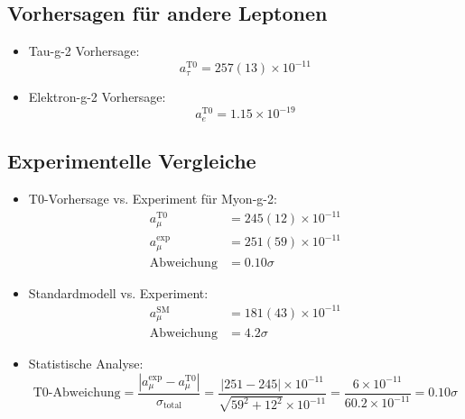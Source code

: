 \documentclass[12pt,a4paper]{article}
\begin{document}
	\subsection{Vorhersagen für andere Leptonen}
\begin{itemize}
	\item Tau-g-2 Vorhersage:
	\begin{equation}
		a_\tau^{\text{T0}} = 257(13) \times 10^{-11}
	\end{equation}
	
	\item Elektron-g-2 Vorhersage:
	\begin{equation}
		a_e^{\text{T0}} = 1.15 \times 10^{-19}
	\end{equation}
\end{itemize}

	\subsection{Experimentelle Vergleiche}
\begin{itemize}
	\item T0-Vorhersage vs. Experiment für Myon-g-2:
	\begin{align}
		a_\mu^{\text{T0}} &= 245(12) \times 10^{-11} \\
		a_\mu^{\text{exp}} &= 251(59) \times 10^{-11} \\
		\text{Abweichung} &= 0.10\sigma
	\end{align}
	
	\item Standardmodell vs. Experiment:
	\begin{align}
		a_\mu^{\text{SM}} &= 181(43) \times 10^{-11} \\
		\text{Abweichung} &= 4.2\sigma
	\end{align}
	
	\item Statistische Analyse:
	\begin{equation}
		\text{T0-Abweichung} = \frac{|a_\mu^{\text{exp}} - a_\mu^{\text{T0}}|}{\sigma_{\text{total}}} = \frac{|251 - 245| \times 10^{-11}}{\sqrt{59^2 + 12^2} \times 10^{-11}} = \frac{6 \times 10^{-11}}{60.2 \times 10^{-11}} = 0.10\sigma
	\end{equation}
\end{itemize}
\end{document}
